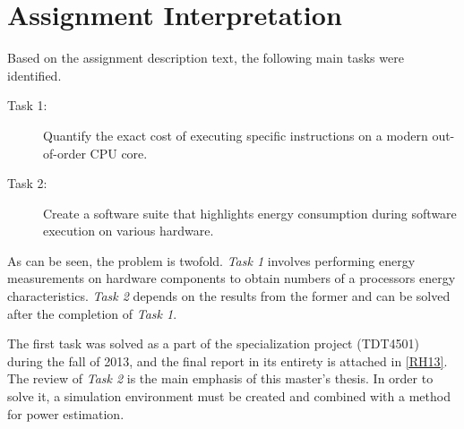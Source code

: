 \section{Assignment Interpretation}

Based on the assignment description text, the following main tasks were
identified.

\begin{description}
    \item[Task 1:] Quantify the exact cost of executing specific instructions on
        a modern out-of-order CPU core.
    \item[Task 2:] Create a software suite that highlights energy consumption
        during software execution on various hardware.
\end{description}

As can be seen, the problem is twofold. \textit{Task 1} involves performing energy
measurements on hardware components to obtain numbers of a processors energy
characteristics. \textit{Task 2} depends on the results from the former and can
be solved after the completion of \textit{Task 1}.

The first task was solved as a part of the specialization project (TDT4501)
during the fall of 2013, and the final report in its entirety is attached in
\autoref{RH13}. The review of \textit{Task 2} is the main emphasis of this
master's thesis. In order to solve it, a simulation environment must be created
and combined with a method for power estimation.

